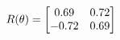 \documentclass[preview]{standalone}
\begin{document}
\begin{align*}
\special{dvisvgm:raw <g id='unique000'>}R(\theta) = \begin{bmatrix}0.69 & 0.72\\-0.72 & 0.69\end{bmatrix}\special{dvisvgm:raw </g>}
\end{align*}
\end{document}
